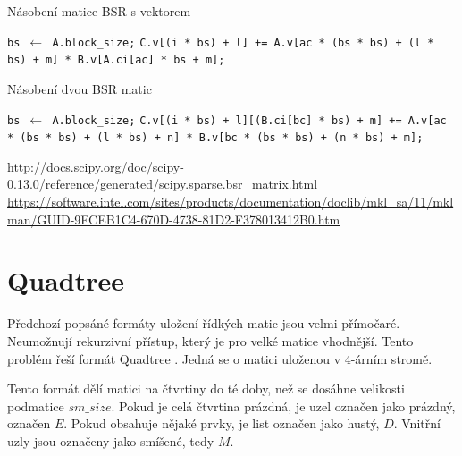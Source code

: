 \label{alg:bsr-mvm}
\begin{algorithm}[H]
	\caption{Násobení matice BSR s vektorem}\label{bsr-mvm}
	\begin{algorithmic}[1]
		\State \texttt{bs $\gets$ A.block\_size;}
						\State \texttt{C.v[(i * bs) + l] += A.v[ac * (bs * bs) + (l * bs) + m] * B.v[A.ci[ac] * bs + m];}
					\EndFor
				\EndFor
			\EndFor
		\EndFor
		\EndProcedure
	\end{algorithmic}
\end{algorithm}

\label{alg:bsr-mmm}
\begin{algorithm}[H]
	\caption{Násobení dvou BSR matic}\label{bsr-mmm}
	\begin{algorithmic}[1]
		\State \texttt{bs $\gets$ A.block\_size;}
								\State \texttt{C.v[(i * bs) + l][(B.ci[bc] * bs) + m] += A.v[ac * (bs * bs) + (l * bs) + n] * B.v[bc * (bs * bs) + (n * bs) + m];}
							\EndFor
						\EndFor
					\EndFor
				\EndFor
			\EndFor
		\EndFor
		\EndProcedure
	\end{algorithmic}
\end{algorithm}

\url{http://docs.scipy.org/doc/scipy-0.13.0/reference/generated/scipy.sparse.bsr_matrix.html}
\url{https://software.intel.com/sites/products/documentation/doclib/mkl_sa/11/mklman/GUID-9FCEB1C4-670D-4738-81D2-F378013412B0.htm}

\section{Quadtree}

Předchozí popsáné formáty uložení řídkých matic jsou velmi přímočaré. Neumožnují rekurzivní přístup, který je pro velké matice vhodnější. Tento problém řeší formát Quadtree \cite{JA_SNA_08_QUAD}\cite{qdtsf}. Jedná se o matici uloženou v 4-árním stromě.

Tento formát dělí matici na čtvrtiny do té doby, než se dosáhne velikosti podmatice $sm\_size$. Pokud je celá čtvrtina prázdná, je uzel označen jako prázdný, označen $E$. Pokud obsahuje nějaké prvky, je list označen jako hustý, $D$. Vnitřní uzly jsou označeny jako smíšené, tedy $M$.

